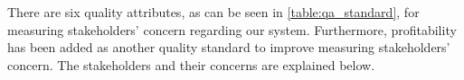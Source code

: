 There are six quality attributes, as can be seen in \autoref{table:qa_standard}, for measuring stakeholders' concern regarding our system. Furthermore, profitability has been added as another quality standard to improve measuring stakeholders' concern. The stakeholders and their concerns are explained below.


